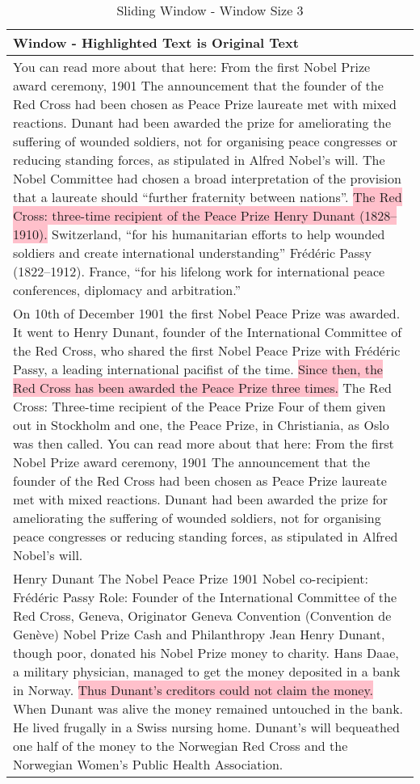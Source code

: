 \begin{table}[h!]
    \footnotesize
    \begin{xltabular}{\linewidth}{X}
        \toprule
        \textbf{Window} - Highlighted Text is Original Text \\
        \midrule
        You can read more about that here: From the first Nobel Prize award ceremony, 1901 The announcement that the founder of the Red Cross had been chosen as Peace Prize laureate met with mixed reactions. Dunant had been awarded the prize for ameliorating the suffering of wounded soldiers, not for organising peace congresses or reducing standing forces, as stipulated in Alfred Nobel’s will. The Nobel Committee had chosen a broad interpretation of the provision that a laureate should “further fraternity  between nations”. \colorbox{pink}{The Red Cross: three-time recipient of the Peace Prize Henry Dunant (1828–1910).}  Switzerland, “for his humanitarian efforts to help wounded soldiers and create international understanding” Frédéric Passy (1822–1912). France, “for his lifelong work for international peace conferences, diplomacy and arbitration.” \\ \hline
        On 10th of December 1901 the first Nobel Peace Prize was awarded. It went to Henry Dunant, founder of the International Committee of the Red Cross, who shared the first Nobel Peace Prize with Frédéric Passy, a leading international pacifist of the time. \colorbox{pink}{Since then, the Red Cross has been awarded the Peace Prize three times.} The Red Cross: Three-time recipient of the Peace Prize Four of them given out in Stockholm and one, the Peace Prize, in Christiania, as Oslo was then called. You can read more about that here: From the first Nobel Prize award ceremony, 1901 The announcement that the founder of the Red Cross had been chosen as Peace Prize laureate met with mixed reactions.  Dunant had been awarded the prize for ameliorating the suffering of wounded soldiers, not for  organising peace congresses or reducing standing forces, as stipulated in Alfred Nobel’s will. \\ \hline
        Henry Dunant The Nobel Peace Prize 1901 Nobel co-recipient: Frédéric Passy Role: Founder of the International Committee of the Red Cross, Geneva, Originator Geneva  Convention (Convention de Genève) Nobel Prize Cash and Philanthropy Jean Henry Dunant, though poor, donated his Nobel Prize money to charity. Hans Daae, a military physician, managed to get the money deposited in a bank in Norway. \colorbox{pink}{Thus Dunant’s creditors could not claim the money.} When Dunant was alive the money remained untouched in the bank. He lived frugally in a Swiss nursing home. Dunant’s will bequeathed one half of the money to the Norwegian Red Cross and the Norwegian Women’s Public Health Association. \\
        \bottomrule
    \end{xltabular}
    \caption{Sliding Window - Window Size 3}
    \label{tab:table-sliding-window}
\end{table}